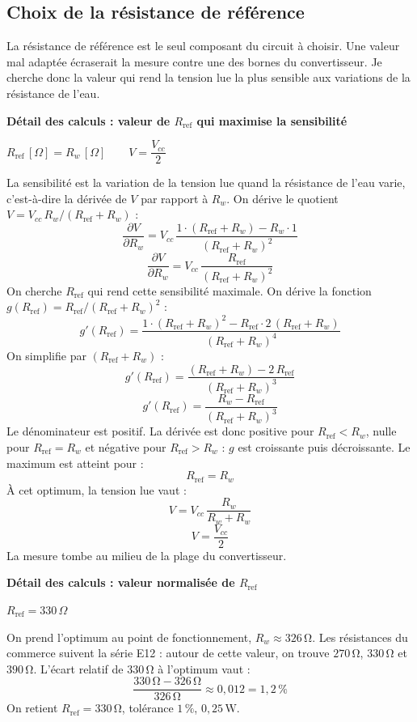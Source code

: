 \documentclass[11pt,a4paper]{article}
\newcommand{\resultat}[1]{\begin{center}{\large\color{bleuENO}$\displaystyle #1$}\end{center}}
\newenvironment{demo}[2]{\par\medskip\noindent\textbf{Détail des calculs : #1}\par\nopagebreak\resultat{#2}}{\par\medskip}
\newcommand{\calcul}[2]{\par\medskip\noindent\textbf{Détail des calculs : #1}\par\nopagebreak\resultat{#2}}
\newcommand{\U}[1]{\,\mathrm{#1}}
\begin{document}
\subsection{Choix de la résistance de référence}

La résistance de référence est le seul composant du circuit à choisir. Une valeur mal adaptée écraserait la mesure contre une des bornes du convertisseur. Je cherche donc la valeur qui rend la tension lue la plus sensible aux variations de la résistance de l'eau.


\begin{demo}{valeur de $R_{\text{ref}}$ qui maximise la sensibilité}{R_{\text{ref}}\,[\Omega] = R_w\,[\Omega] \qquad V = \dfrac{V_{cc}}{2}}
La sensibilité est la variation de la tension lue quand la résistance de l'eau varie, c'est-à-dire la dérivée de $V$ par rapport à $R_w$. On dérive le quotient $V = V_{cc} \, R_w / (R_{\text{ref}} + R_w)$ :
\[
\frac{\partial V}{\partial R_w} = V_{cc} \, \frac{1 \cdot (R_{\text{ref}} + R_w) - R_w \cdot 1}{(R_{\text{ref}} + R_w)^2}
\]
\[
\frac{\partial V}{\partial R_w} = V_{cc} \, \frac{R_{\text{ref}}}{(R_{\text{ref}} + R_w)^2}
\]
On cherche $R_{\text{ref}}$ qui rend cette sensibilité maximale. On dérive la fonction $g(R_{\text{ref}}) = R_{\text{ref}} / (R_{\text{ref}} + R_w)^2$ :
\[
g'(R_{\text{ref}}) = \frac{1 \cdot (R_{\text{ref}} + R_w)^2 - R_{\text{ref}} \cdot 2 \, (R_{\text{ref}} + R_w)}{(R_{\text{ref}} + R_w)^4}
\]
On simplifie par $(R_{\text{ref}} + R_w)$ :
\[
g'(R_{\text{ref}}) = \frac{(R_{\text{ref}} + R_w) - 2 \, R_{\text{ref}}}{(R_{\text{ref}} + R_w)^3}
\]
\[
g'(R_{\text{ref}}) = \frac{R_w - R_{\text{ref}}}{(R_{\text{ref}} + R_w)^3}
\]
Le dénominateur est positif. La dérivée est donc positive pour $R_{\text{ref}} < R_w$, nulle pour $R_{\text{ref}} = R_w$ et négative pour $R_{\text{ref}} > R_w$ : $g$ est croissante puis décroissante. Le maximum est atteint pour :
\[
R_{\text{ref}} = R_w
\]
À cet optimum, la tension lue vaut :
\[
V = V_{cc} \, \frac{R_w}{R_w + R_w}
\]
\[
V = \frac{V_{cc}}{2}
\]
La mesure tombe au milieu de la plage du convertisseur.
\end{demo}

\calcul{valeur normalisée de $R_{\text{ref}}$}{R_{\text{ref}} = 330\,\Omega}
On prend l'optimum au point de fonctionnement, $R_w \approx 326\U{\Omega}$. Les résistances du commerce suivent la série E12 : autour de cette valeur, on trouve $270\U{\Omega}$, $330\U{\Omega}$ et $390\U{\Omega}$. L'écart relatif de $330\U{\Omega}$ à l'optimum vaut :
\[
\frac{330\U{\Omega} - 326\U{\Omega}}{326\U{\Omega}} \approx 0{,}012 = 1{,}2\U{\%}
\]
On retient $R_{\text{ref}} = 330\U{\Omega}$, tolérance $1\U{\%}$, $0{,}25\U{W}$.
\end{document}
